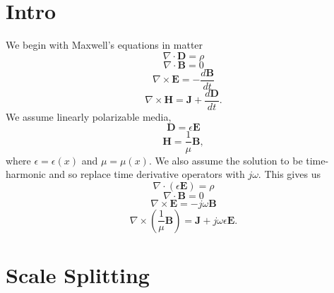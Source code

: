 \documentclass{article}
\theoremstyle{plain}
\begin{document}
\section{Intro}\label{sec:intro}

We begin with Maxwell's equations in matter
\begin{equation}
	\nabla\cdot\mathbf{D} = \rho
\end{equation}
\begin{equation}
	\nabla\cdot\mathbf{B} = 0
\end{equation}
\begin{equation}
	\nabla\times\mathbf{E} = -\frac{d\mathbf{B}}{dt}
\end{equation}
\begin{equation}
	\nabla\times\mathbf{H} = \mathbf{J} + \frac{d\mathbf{D}}{dt}.
\end{equation}
We assume linearly polarizable media,
\begin{equation}
	\mathbf{D} = \epsilon\mathbf{E}
\end{equation}
\begin{equation}
	\mathbf{H} = \frac{1}{\mu}\mathbf{B},
\end{equation}
where $\epsilon=\epsilon(x)$ and $\mu=\mu(x)$. We also assume the solution to be time-harmonic and so replace time derivative operators with $j\omega$. This gives us
\begin{equation}\label{eq:max1}
	\nabla\cdot\left(\epsilon\mathbf{E}\right) = \rho
\end{equation}
\begin{equation}\label{eq:max2}
	\nabla\cdot\mathbf{B} = 0
\end{equation}
\begin{equation}\label{eq:max3}
	\nabla\times\mathbf{E} = -j\omega\mathbf{B}
\end{equation}
\begin{equation}\label{eq:max4}
	\nabla\times\left(\frac{1}{\mu}\mathbf{B}\right) = \mathbf{J} + j\omega\epsilon\mathbf{E}.
\end{equation}


\section{Scale Splitting}\label{sec:scaleSplit}
\end{document}
